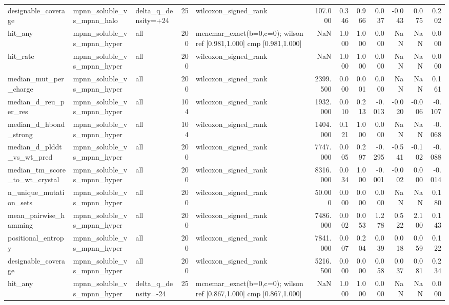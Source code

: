 \begin{table}
{\begin{tabular}{lllrlrrrrrrr}
designable\_coverage & mpnn\_soluble\_vs\_mpnn\_halo & delta\_q\_density=+24 & 25 & wilcoxon\_signed\_rank & 107.000 & 0.346 & 0.966 & 0.037 & -0.043 & 0.075 & 0.202 \\
hit\_any & mpnn\_soluble\_vs\_mpnn\_hyper & all & 200 & mcnemar\_exact(b=0,c=0); wilson ref [0.981,1.000] cmp [0.981,1.000] & NaN & 1.000 & 1.000 & 0.000 & NaN & NaN & 0.000 \\
hit\_rate & mpnn\_soluble\_vs\_mpnn\_hyper & all & 200 & wilcoxon\_signed\_rank & NaN & 1.000 & 1.000 & 0.000 & NaN & NaN & 0.000 \\
median\_mut\_per\_charge & mpnn\_soluble\_vs\_mpnn\_hyper & all & 200 & wilcoxon\_signed\_rank & 2399.500 & 0.000 & 0.001 & 0.000 & NaN & NaN & 0.161 \\
median\_d\_reu\_per\_res & mpnn\_soluble\_vs\_mpnn\_hyper & all & 104 & wilcoxon\_signed\_rank & 1932.000 & 0.010 & 0.213 & -0.013 & -0.020 & -0.006 & -0.107 \\
median\_d\_hbond\_strong & mpnn\_soluble\_vs\_mpnn\_hyper & all & 104 & wilcoxon\_signed\_rank & 1404.000 & 0.121 & 1.000 & 0.000 & NaN & NaN & -0.068 \\
median\_d\_plddt\_vs\_wt\_pred & mpnn\_soluble\_vs\_mpnn\_hyper & all & 200 & wilcoxon\_signed\_rank & 7747.000 & 0.005 & 0.297 & -0.295 & -0.541 & -0.102 & -0.088 \\
median\_tm\_score\_to\_wt\_crystal & mpnn\_soluble\_vs\_mpnn\_hyper & all & 200 & wilcoxon\_signed\_rank & 8316.000 & 0.034 & 1.000 & -0.001 & -0.002 & 0.000 & -0.014 \\
n\_unique\_mutation\_sets & mpnn\_soluble\_vs\_mpnn\_hyper & all & 200 & wilcoxon\_signed\_rank & 50.000 & 0.000 & 0.000 & 0.000 & NaN & NaN & 0.180 \\
mean\_pairwise\_hamming & mpnn\_soluble\_vs\_mpnn\_hyper & all & 200 & wilcoxon\_signed\_rank & 7486.000 & 0.002 & 0.053 & 1.278 & 0.522 & 2.100 & 0.143 \\
positional\_entropy & mpnn\_soluble\_vs\_mpnn\_hyper & all & 200 & wilcoxon\_signed\_rank & 7841.000 & 0.007 & 0.204 & 0.039 & 0.018 & 0.059 & 0.122 \\
designable\_coverage & mpnn\_soluble\_vs\_mpnn\_hyper & all & 200 & wilcoxon\_signed\_rank & 5216.500 & 0.000 & 0.000 & 0.058 & 0.037 & 0.081 & 0.234 \\
hit\_any & mpnn\_soluble\_vs\_mpnn\_hyper & delta\_q\_density=-24 & 25 & mcnemar\_exact(b=0,c=0); wilson ref [0.867,1.000] cmp [0.867,1.000] & NaN & 1.000 & 1.000 & 0.000 & NaN & NaN & 0.000 \\

\end{tabular}}
\end{table}
